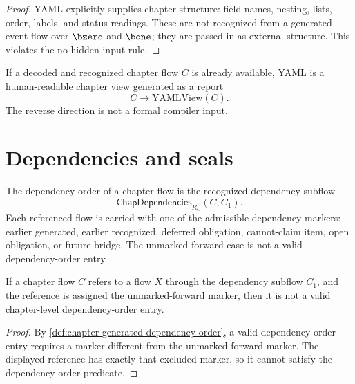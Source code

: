 \begin{proof}
YAML explicitly supplies chapter structure: field names, nesting, lists, order, labels, and status readings. These are not recognized from a generated event flow over $\bzero$ and $\bone$; they are passed in as external structure. This violates the no-hidden-input rule.
\end{proof}

\begin{corollary}
\label{cor:chapter-generated-yaml-may-report}
If a decoded and recognized chapter flow $C$ is already available, YAML is a human-readable chapter view generated as a report
$$
  C\longrightarrow \mathrm{YAMLView}(C).
$$
The reverse direction is not a formal compiler input.
\end{corollary}

\section{Dependencies and seals}
\label{sec:chapter-generated-dependencies-seals}

\begin{definition}
\label{def:chapter-generated-dependency-order}
The dependency order of a chapter flow is the recognized dependency subflow
$$
  \mathsf{ChapDependencies}_{R_C}(C,C_1).
$$
Each referenced flow is carried with one of the admissible dependency markers: earlier generated, earlier recognized, deferred obligation, cannot-claim item, open obligation, or future bridge. The unmarked-forward case is not a valid dependency-order entry.
\end{definition}

\begin{theorem}
\label{thm:chapter-generated-no-forward-dependency-without-marker}
If a chapter flow $C$ refers to a flow $X$ through the dependency subflow $C_1$, and the reference is assigned the unmarked-forward marker, then it is not a valid chapter-level dependency-order entry.
\end{theorem}

\begin{proof}
By \autoref{def:chapter-generated-dependency-order}, a valid dependency-order entry requires a marker different from the unmarked-forward marker. The displayed reference has exactly that excluded marker, so it cannot satisfy the dependency-order predicate.
\end{proof}

